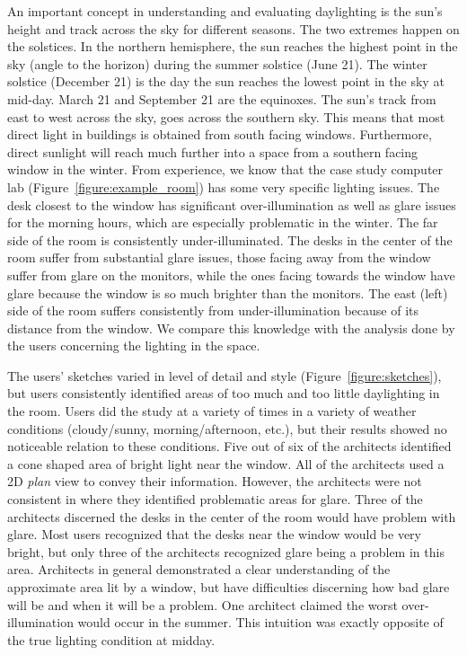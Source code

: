 \documentclass{article}
\begin{document}
An important concept in understanding and evaluating daylighting is
the sun's height and track across the sky for different seasons.  The
two extremes happen on the solstices.  In the northern hemisphere, the
sun reaches the highest point in the sky (angle to the horizon) during
the summer solstice (June 21).  The winter solstice (December 21) is
the day the sun reaches the lowest point in the sky at mid-day.  March
21 and September 21 are the equinoxes.  The sun's track from east to
west across the sky, goes across the southern sky.  This means that
most direct light in buildings is obtained from south facing windows.
Furthermore, direct sunlight will reach much further into a space from
a southern facing window in the winter.
%
From experience, we know that the case study computer lab
(Figure~\ref{figure:example_room}) has some very specific lighting issues.
The desk closest to the window has significant over-illumination as
well as glare issues for the morning hours, which are especially
problematic in the winter.  The far side of the room is consistently
under-illuminated.  The desks in the center of the room suffer from
substantial glare issues, those facing away from the window suffer
from glare on the monitors, while the ones facing towards the window
have glare because the window is so much brighter than the monitors.
The east (left) side of the room suffers consistently from
under-illumination because of its distance from the window.  We
compare this knowledge with the analysis done by the users concerning
the lighting in the space.

The users' sketches varied in level of detail and style
(Figure~\ref{figure:sketches}), but users consistently identified
areas of too much and too little daylighting in the room.  Users did
the study at a variety of times in a variety of weather conditions
(cloudy/sunny, morning/afternoon, etc.), but their results showed no
noticeable relation to these conditions.  Five out of six of the
architects identified a cone shaped area of bright light near the
window.  All of the architects used a 2D {\em plan} view to convey
their information.  However, the architects were not consistent in
where they identified problematic areas for glare.  Three of the
architects discerned the desks in the center of the room would have
problem with glare.  Most users recognized that the desks near the
window would be very bright, but only three of the architects
recognized glare being a problem in this area.  Architects in general
demonstrated a clear understanding 
of the approximate area lit by a
window, but have difficulties discerning how bad glare will be and
when it will be a problem.  One architect claimed the worst
over-illumination would occur in the summer.  This intuition was
exactly opposite of the true lighting condition at midday.
\end{document}
